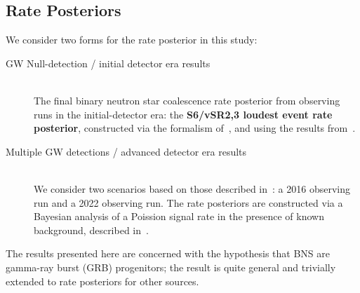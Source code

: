 \documentclass[a0,landscape]{a0poster}
\newcommand{\cbcrate}{{{\mathcal R}}}
\def\grb#1{gamma-ray burst#1 (GRB#1)\gdef\grb{GRB}}
\begin{document}
\begin{multicols}{4}
\subsection*{Rate Posteriors}
We consider two forms for the rate posterior in this study:
\begin{description}
    \item [GW Null-detection / initial detector era results]
         ~\\The final binary neutron star coalescence rate posterior from observing
        runs in the initial-detector era: the {\bf S6/vSR2,3 loudest event rate
        posterior}, constructed via the formalism
        of~\cite{2008CQGra..25j5002B},
        and using the results from~\cite{s6lowmass}.
    \item [Multiple GW detections / advanced detector era results]
         ~\\We consider two scenarios based on those described
         in~\cite{2013arXiv1304.0670L}: a 2016 observing run and a 2022 observing run.
         The rate posteriors are constructed via a Bayesian analysis of a
         Poission signal rate in the presence of known background, described
         in~\cite{Gregory05}.
\end{description}
%
The results presented here are concerned with the hypothesis that BNS are \grb{}
progenitors;  the result is quite general and trivially extended to rate
posteriors for other sources.
    

\end{multicols}
\end{document}
